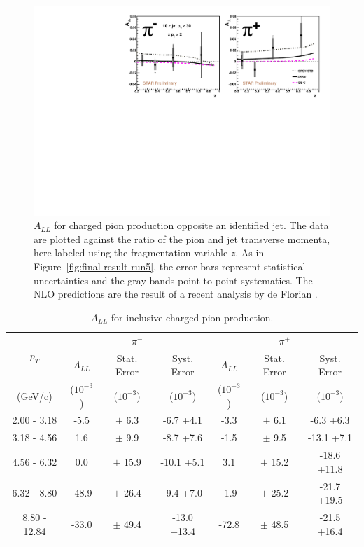 \begin{figure}[]
  \includegraphics[width=1.0\textwidth]{figures/final-result-run6-3}
  \caption{$A_{LL}$ for charged pion production opposite an identified jet.  The data are plotted against the ratio of the pion and jet transverse momenta, here labeled using the fragmentation variable $z$.  As in Figure~\ref{fig:final-result-run5}, the error bars represent statistical uncertainties and the gray bands point-to-point systematics.  The NLO predictions are the result of a recent analysis by de Florian \cite{}.}
  \label{fig:final-result-run6}
\end{figure}

\begin{table}
  \centering
  \begin{tabular}{|c||c|c|c||c|c|c|}
    \hline
    \multirow{2}{*}{$p_T$} & \multicolumn{3}{c||}{$\pi^{-}$} & \multicolumn{3}{c|}{$\pi^{+}$} \\
    \cline{2-7}
    & $A_{LL}$ & Stat. Error & Syst. Error &$A_{LL}$ & Stat. Error & Syst. Error\\
    (GeV/c) & ($10^{-3}$) & ($10^{-3}$) & ($10^{-3}$) & ($10^{-3}$) & ($10^{-3}$) & ($10^{-3}$) \\
    \hline
    \hline
    2.00 - 3.18 & -5.5 & $\pm$ 6.3 & -6.7 +4.1 
                &  -3.3 & $\pm$ 6.1 & -6.3 +6.3\\
    3.18 - 4.56 & 1.6 & $\pm$ 9.9 & -8.7 +7.6 
                &  -1.5 & $\pm$ 9.5 & -13.1 +7.1\\
    4.56 - 6.32 & 0.0 & $\pm$ 15.9 & -10.1 +5.1 
                &  3.1 & $\pm$ 15.2 & -18.6 +11.8\\
    6.32 - 8.80 & -48.9 & $\pm$ 26.4 & -9.4 +7.0 
                &  -1.9 & $\pm$ 25.2 & -21.7 +19.5\\
    8.80 - 12.84 & -33.0 & $\pm$ 49.4 & -13.0 +13.4 
                &  -72.8 & $\pm$ 48.5 & -21.5 +16.4\\
    \hline
  \end{tabular}
  \caption{$A_{LL}$ for inclusive charged pion production.}
  \label{tab:final-2005-result}
\end{table}

